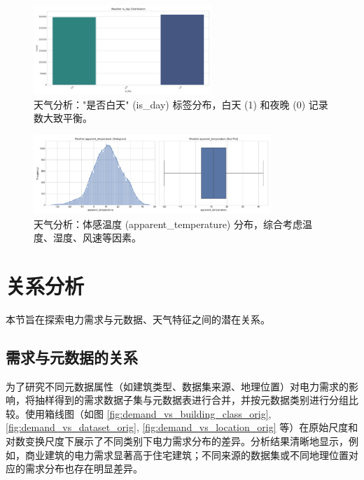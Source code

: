 \documentclass{article} %
\begin{document}
\begin{figure}[H]
    \centering
    \includegraphics[width=0.6\textwidth]{../plots/weather_distribution_is_day.png}
    \caption{天气分析："是否白天" (is\_day) 标签分布，白天 (1) 和夜晚 (0) 记录数大致平衡。} %
    \label{fig:weather_dist_is_day}
\end{figure}

\begin{figure}[H]
    \centering
    \includegraphics[width=0.8\textwidth]{../plots/weather_distribution_apparent_temperature.png}
    \caption{天气分析：体感温度 (apparent\_temperature) 分布，综合考虑温度、湿度、风速等因素。} %
    \label{fig:weather_dist_apparent_temp}
\end{figure}

\section{关系分析}
\label{sec:relationship_analysis}

本节旨在探索电力需求与元数据、天气特征之间的潜在关系。

\subsection{需求与元数据的关系}
\label{subsec:demand_metadata}

为了研究不同元数据属性（如建筑类型、数据集来源、地理位置）对电力需求的影响，将抽样得到的需求数据子集与元数据表进行合并，并按元数据类别进行分组比较。使用箱线图（如图 \ref{fig:demand_vs_building_class_orig}, \ref{fig:demand_vs_dataset_orig}, \ref{fig:demand_vs_location_orig} 等）在原始尺度和对数变换尺度下展示了不同类别下电力需求分布的差异。分析结果清晰地显示，例如，商业建筑的电力需求显著高于住宅建筑；不同来源的数据集或不同地理位置对应的需求分布也存在明显差异。
\end{document}
